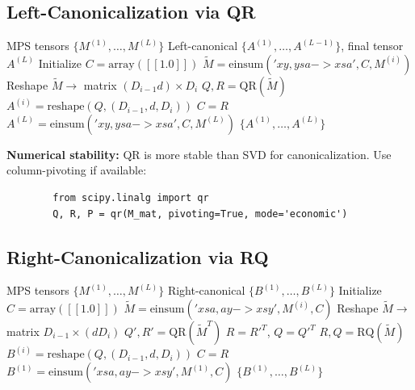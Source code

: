 \documentclass[aps,prb,onecolumn,scriptaddress]{revtex4-2}
\begin{document}
	\subsection{Left-Canonicalization via QR}
	
	\begin{algorithm}[H]
		\caption{LeftCanonicalize}
		\begin{algorithmic}[1]
			\Require MPS tensors $\{M^{(1)}, \ldots, M^{(L)}\}$
			\Ensure Left-canonical $\{A^{(1)}, \ldots, A^{(L-1)}\}$, final tensor $A^{(L)}$
			\State Initialize $C = \text{array}([[1.0]])$ 
			\State {}
			\State $\tilde{M} = \text{einsum}('xy,ysa->xsa', C, M^{(i)})$ 
			\State Reshape $\tilde{M} \to$ matrix $(D_{i-1}d) \times D_i$
			\State $Q, R = \text{QR}(\tilde{M})$ 
			\State $A^{(i)} = \text{reshape}(Q, (D_{i-1}, d, D_i))$
			\State $C = R$ 
			\EndFor
			\State {}
			\State $A^{(L)} = \text{einsum}('xy,ysa->xsa', C, M^{(L)})$ 
			\State \Return $\{A^{(1)}, \ldots, A^{(L)}\}$
		\end{algorithmic}
	\end{algorithm}
	
	\textbf{Numerical stability:} QR is more stable than SVD for canonicalization. Use column-pivoting if available:
	\begin{verbatim}
		from scipy.linalg import qr
		Q, R, P = qr(M_mat, pivoting=True, mode='economic')
	\end{verbatim}
	
	\subsection{Right-Canonicalization via RQ}
	
	\begin{algorithm}[H]
		\caption{RightCanonicalize}
		\begin{algorithmic}[1]
			\Require MPS tensors $\{M^{(1)}, \ldots, M^{(L)}\}$
			\Ensure Right-canonical $\{B^{(1)}, \ldots, B^{(L)}\}$
			\State Initialize $C = \text{array}([[1.0]])$ 
			\State {}
			\State $\tilde{M} = \text{einsum}('xsa,ay->xsy', M^{(i)}, C)$ 
			\State Reshape $\tilde{M} \to$ matrix $D_{i-1} \times (dD_i)$
			\State {}
			\State {}
			\State $Q', R' = \text{QR}(\tilde{M}^T)$
			\State $R = R'^T$, $Q = Q'^T$
			\Else
			\State $R, Q = \text{RQ}(\tilde{M})$
			\EndIf
			\State $B^{(i)} = \text{reshape}(Q, (D_{i-1}, d, D_i))$
			\State $C = R$ 
			\EndFor
			\State {}
			\State $B^{(1)} = \text{einsum}('xsa,ay->xsy', M^{(1)}, C)$ 
			\State \Return $\{B^{(1)}, \ldots, B^{(L)}\}$
		\end{algorithmic}
	\end{algorithm}
	
\end{document}
